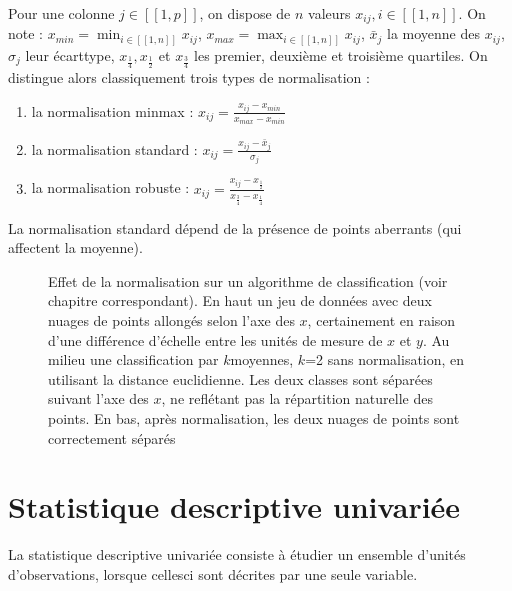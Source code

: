\documentclass[letterpaper,10pt,english]{jupyterBook}
\begin{document}
\sphinxAtStartPar
Pour une colonne \(j\in[\![1,p]\!]\), on dispose de \(n\) valeurs \(x_{ij},i\in[\![1,n]\!]\). On note : \(x_{min} = \displaystyle\min_{i\in[\![1,n]\!]}x_{ij}\), \(x_{max} = \displaystyle\max_{i\in[\![1,n]\!]}x_{ij}\),   \(\bar x_j\) la moyenne des \(x_{ij}\), \(\sigma_j\) leur écart\sphinxhyphen{}type, \(x_\frac14, x_\frac12\) et \(x_\frac34\) les premier, deuxième et troisième quartiles. On distingue alors classiquement trois types de normalisation :
\begin{enumerate}
%
\item {} 
\sphinxAtStartPar
la normalisation min\sphinxhyphen{}max : \(x_{ij} = \frac{x_{ij}-x_{min}}{x_{max}-x_{min}}\)

\item {} 
\sphinxAtStartPar
la normalisation standard : \(x_{ij}=\frac{x_{ij}-\bar x_j}{\sigma_j}\)

\item {} 
\sphinxAtStartPar
la normalisation robuste : \(x_{ij}=\frac{x_{ij}-x_\frac12}{x_\frac34-x_\frac14}\)

\end{enumerate}

\sphinxAtStartPar
La normalisation standard dépend de la présence de points aberrants (qui affectent la moyenne).

\begin{figure}[htbp]
\centering
\capstart

\noindent{}
\caption{Effet de la normalisation sur un algorithme de classification (voir chapitre correspondant). En haut un jeu de données avec deux nuages de points allongés selon l’axe des \(x\), certainement en raison d’une différence d’échelle entre les unités de mesure de \(x\) et \(y\). Au milieu une classification par \(k\)\sphinxhyphen{}moyennes, \(k\)=2 sans normalisation, en utilisant la distance euclidienne. Les deux classes sont séparées suivant l’axe des \(x\), ne reflétant pas la répartition naturelle des points. En bas, après normalisation, les deux nuages de points sont correctement séparés}\label{\detokenize{statsdescriptives:biais}}\end{figure}


\section{Statistique descriptive univariée}
\label{\detokenize{statsdescriptives:statistique-descriptive-univariee}}
\ignorespaces 
\sphinxAtStartPar
La statistique descriptive univariée consiste à étudier un ensemble d’unités d’observations, lorsque celles\sphinxhyphen{}ci sont décrites par une seule variable.
\end{document}
